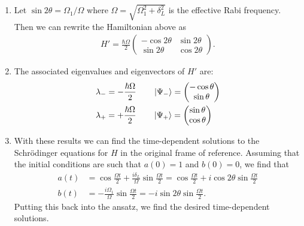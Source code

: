 \documentclass{article}
\theoremstyle{definition}
\newcommand{\f}[2]{\frac{#1}{#2}}
\begin{document}
\begin{enumerate}[label=(\alph*)]
\item Let $\sin 2\theta = \Omega_1/\Omega$ where $\Omega = \sqrt{\Omega_1^2 + \delta_L^2}$ is the effective Rabi frequency. Then we can rewrite the Hamiltonian above as
\begin{align*}
H' =  \f{\hbar \Omega}{2} \begin{pmatrix}
-\cos 2\theta & \sin 2 \theta \\ \sin 2 \theta & \cos 2\theta
\end{pmatrix}. 
\end{align*}


\item The associated eigenvalues and eigenvectors of $H'$ are:
\begin{align*}
&\lambda_- = - \f{\hbar \Omega}{2}  \quad\quad \ket{\Psi_-} = \begin{pmatrix}
-\cos \theta \\ \sin\theta
\end{pmatrix}\\
&\lambda_+ = + \f{\hbar \Omega}{2} \quad\quad \ket{\Psi_+} = \begin{pmatrix}
\sin\theta \\ \cos\theta
\end{pmatrix}
\end{align*}

\item With these results we can find the time-dependent solutions to the Schr\"{o}dinger equations for $H$ in the original frame of reference. Assuming that the initial conditions are such that $a(0) = 1$ and $b(0) =0$, we find that
\begin{align*}
a(t) &= \cos \f{\Omega t}{2} + \f{i\delta_L}{\Omega} \sin \f{\Omega t}{2} = \cos \f{\Omega t}{2} + i \cos 2 \theta \sin \f{\Omega t}{2}\\ 
b(t) &= - \f{i\Omega_1}{\Omega} \sin \f{\Omega t}{2} = -i \sin 2\theta \sin \f{\Omega t}{2} .
\end{align*}
Putting this back into the ansatz, we find the desired time-dependent solutions. 

\end{enumerate}
\end{document}
